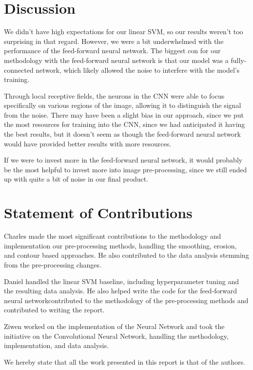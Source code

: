 \documentclass[conference]{IEEEtran}
\begin{document}
\section{\textbf{Discussion}}

We didn't have high expectations for our linear SVM, so our results weren't too surprising in that regard. However, we were a bit underwhelmed with the performance of the feed-forward neural network. The biggest con for our methodology with the feed-forward neural network is that our model was a fully-connected network, which likely allowed the noise to interfere with the model's training.

Through local receptive fields, the neurons in the CNN were able to focus specifically on various regions of the image, allowing it to distinguish the signal from the noise. There may have been a slight bias in our approach, since we put the most resources for training into the CNN, since we had anticipated it having the best results, but it doesn't seem as though the feed-forward neural network would have provided better results with more resources.

If we were to invest more in the feed-forward neural network, it would probably be the most helpful to invest more into image pre-processing, since we still ended up with quite a bit of noise in our final product.

\section{\textbf{Statement of Contributions}}

Charles made the most significant contributions to the methodology and implementation our pre-processing methods, handling the smoothing, erosion, and contour based approaches. He also contributed to the data analysis stemming from the pre-processing changes.

Daniel handled the linear SVM baseline, including hyperparameter tuning and the resulting data analysis. He also helped write the code for the feed-forward neural networkcontributed to the methodology of the pre-processing methods and contributed to writing the report.

Ziwen worked on the implementation of the Neural Network and took the initiative on the Convolutional Neural Network, handling the methodology, implementation, and data analysis.

We hereby state that all the work presented in this report is that of the authors. 
\end{document}
